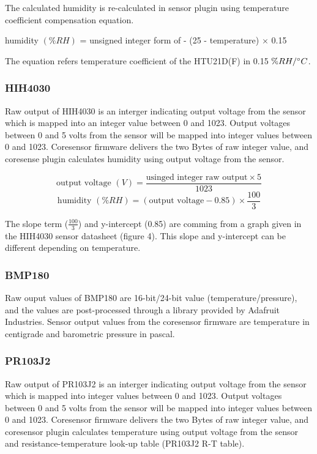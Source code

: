 \bigbreak
 The calculated humidity is re-calculated in sensor plugin using temperature coefficient compensation equation. \\

{\centering
 humidity \((\%RH)\) = unsigned integer form of  - (25 - temperature) $\times$ 0.15
 \par
}

\bigbreak
The equation refers temperature coefficient of the HTU21D(F) in 0.15 \(\%RH/\degree C\).

\subsubsection{ HIH4030}

Raw output of HIH4030 is an interger indicating output voltage from the sensor which is mapped into an integer value between 0 and 1023. Output voltages between 0 and 5 volts from the sensor will be mapped into integer values between 0 and 1023. Coresensor firmware delivers the two Bytes of raw integer value, and coresense plugin calculates humidity using output voltage from the sensor.

{\centering
 \[ \text{output voltage \((V)\)} = \frac{\text{usinged integer raw output} \times 5}{1023} \] 
 \[ \text{humidity \((\%RH)\)} = (\text{output voltage} - 0.85) \times \frac{100}{3} \]
 \par
 }
\bigbreak
The slope term (\(\frac{100}{3}\)) and y-intercept (0.85) are comming from a graph given in the HIH4030 sensor datasheet (figure 4). This slope and y-intercept can be different depending on temperature.

\subsubsection{ BMP180}

Raw ouput values of BMP180 are 16-bit/24-bit value (temperature/pressure), and the values are post-processed through a library provided by Adafruit Industries. Sensor output values from the coresensor firmware are temperature in centigrade and barometric pressure in pascal.


\subsubsection{ PR103J2}

Raw output of PR103J2 is an interger indicating output voltage from the sensor which is mapped into integer values between 0 and 1023. Output voltages between 0 and 5 volts from the sensor will be mapped into integer values between 0 and 1023. Coresensor firmware delivers the two Bytes of raw integer value, and coresensor plugin calculates temperature using output voltage from the sensor and resistance-temperature look-up table (PR103J2 R-T table).

